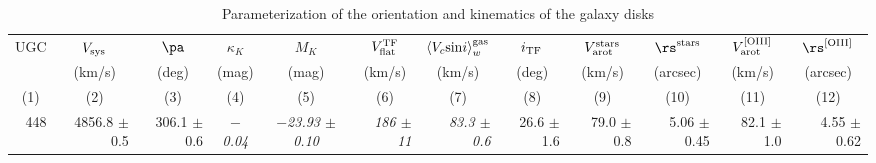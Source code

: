 \begin{table}
\caption{\label{tab:mK2iTF}
Parameterization of the orientation and kinematics of the galaxy disks}
\centering
%
{\tiny
\renewcommand{\tabcolsep}{1.05mm}
\begin{tabular}{|rrrccrrrrrrr|}
\hline
\multicolumn{1}{|c}{UGC}                        & 
\multicolumn{1}{c}{$V_{\rm sys}$}               & 
\multicolumn{1}{c}{$\pa$}                       & 
\multicolumn{1}{c}{$\kappa_{K}$}                &   
\multicolumn{1}{c}{$M_K$}                       &   
\multicolumn{1}{c}{$V_{\rm flat}^{\rm TF}$}     & 
\multicolumn{1}{c}{$\left<{V}_c{\rm sin}i\right>_w^{\rm gas}$} &
\multicolumn{1}{c}{$i_{\rm TF}$}                & 
\multicolumn{1}{c}{$V_{\rm arot}^{\rm stars}$}  & 
\multicolumn{1}{c}{$\rs^{\rm stars}$}           & 
\multicolumn{1}{c}{$V_{\rm arot}^{\rm [OIII]}$} &
\multicolumn{1}{c|}{$\rs^{\rm [OIII]}$}         \\ 
%
\multicolumn{1}{|c}{}                &   
\multicolumn{1}{c}{(km/s)}           & 
\multicolumn{1}{c}{(deg)}            & 
\multicolumn{1}{c}{(mag)}            & 
\multicolumn{1}{c}{(mag)}            & 
\multicolumn{1}{c}{(km/s)}           &   
\multicolumn{1}{c}{(km/s)}           & 
\multicolumn{1}{c}{(deg)}            &   
\multicolumn{1}{c}{(km/s)}           &   
\multicolumn{1}{c}{(arcsec)}         & 
\multicolumn{1}{c}{(km/s)}           &
\multicolumn{1}{c|}{(arcsec)}        \\
%
\multicolumn{1}{|c}{(1)}             &   
\multicolumn{1}{c}{(2)}              & 
\multicolumn{1}{c}{(3)}              & 
\multicolumn{1}{c}{(4)}              & 
\multicolumn{1}{c}{(5)}              &   
\multicolumn{1}{c}{(6)}              & 
\multicolumn{1}{c}{(7)}              &   
\multicolumn{1}{c}{(8)}              &   
\multicolumn{1}{c}{(9)}              & 
\multicolumn{1}{c}{(10)}             &
\multicolumn{1}{c}{(11)}             &
\multicolumn{1}{c|}{(12)}            \\
%
\hline
   448 &  4856.8 $\pm$ 0.5 & 306.1 $\pm$ 0.6 &{\it $-$0.04}&{\it $-$23.93 $\pm$ 0.10}&{\it 186 $\pm$           11}&{\it  83.3 $\pm$ 0.6}& 26.6 $\pm$ 1.6  &  79.0 $\pm$ 0.8 &  5.06 $\pm$ 0.45 &  82.1 $\pm$ \phantom{1}1.0 &  4.55 $\pm$ \phantom{1}0.62  \\

\end{tabular}}
\end{table}
